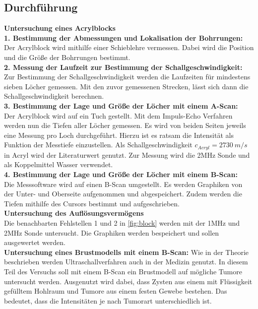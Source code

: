 \subsection{Durchführung}
\textbf{Untersuchung eines Acrylblocks}\\
\textbf{1. Bestimmung der Abmessungen und Lokalisation der Bohrrungen:}\\
Der Acrylblock wird mithilfe einer Schieblehre vermessen. Dabei wird die Position und die Größe der Bohrrungen bestimmt.\\
\textbf{2. Messung der Laufzeit zur Bestimmung der Schallgeschwindigkeit:}\\
Zur Bestimmung der Schallgeschwindigkeit werden die Laufzeiten für mindestens sieben Löcher gemessen. Mit den zuvor gemessenen Strecken, lässt sich dann 
die Schallgeschwindigkeit berechnen.\\
\textbf{3. Bestimmung der Lage und Größe der Löcher mit einem A-Scan:}\\
Der Acrylblock wird auf ein Tuch gestellt. Mit dem Impuls-Echo Verfahren werden nun die Tiefen aller Löcher gemessen. Es wird von beiden Seiten jeweils eine Messung pro Loch 
durchgeführt. Hierzu ist es ratsam die Intensität als Funktion
der Messtiefe einzustellen. Als Schallgeschwindigkeit $c_{Acryl} = \SI{2730}{m/s}$ in Acryl wird der Literaturwert \cite{acryl} genutzt. Zur Messung wird die 
2MHz Sonde und als Koppelmittel Wasser verwendet.\\
\textbf{4. Bestimmung der Lage und Größe der Löcher mit einem B-Scan:}\\
Die Messsoftware wird auf einen B-Scan umgestellt. Es werden Graphiken von der Unter- und Oberseite aufgenommen und abgespeichert. Zudem werden die Tiefen mithilfe des
Cursors bestimmt und aufgeschrieben.\\
\textbf{Untersuchung des Auflösungsvermögens}\\
Die benachbarten Fehlstellen 1 und 2 in \autoref{fig:block} werden mit der 1MHz und 2MHz Sonde untersucht. Die Graphiken werden bespeichert und sollen ausgewertet werden.\\ 
\textbf{Untersuchung eines Brustmodells mit einem B-Scan:}
Wie in der Theorie beschrieben werden Ultraschallverfahren auch in der Medizin genutzt. In diesem Teil des Versuchs soll mit einem B-Scan ein Brustmodell auf mögliche
Tumore untersucht werden. Ausgenutzt wird dabei, dass Zysten aus einem mit Flüssigkeit gefülltem Hohlraum und Tumore aus einem festen Gewebe bestehen. Das bedeutet, dass
die Intensitäten je nach Tumorart unterschiedlich ist.\\
